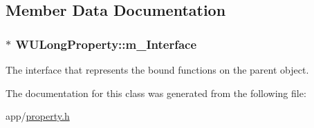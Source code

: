 \subsection{Member Data Documentation}
\hypertarget{class_w_u_long_property_ae67a466defe432cdd559c753dc02a5a0}{
\subsubsection[{m\-\_\-\-Interface}]{$\ast$ W\-U\-Long\-Property\-::m\-\_\-\-Interface\hspace{0.3cm}{\ttfamily [protected]}}}\label{class_w_u_long_property_ae67a466defe432cdd559c753dc02a5a0}
The interface that represents the bound functions on the parent object. 

The documentation for this class was generated from the following file\-:\begin{DoxyCompactItemize}
\item 
app/\hyperlink{property_8h}{property.\-h}\end{DoxyCompactItemize}

